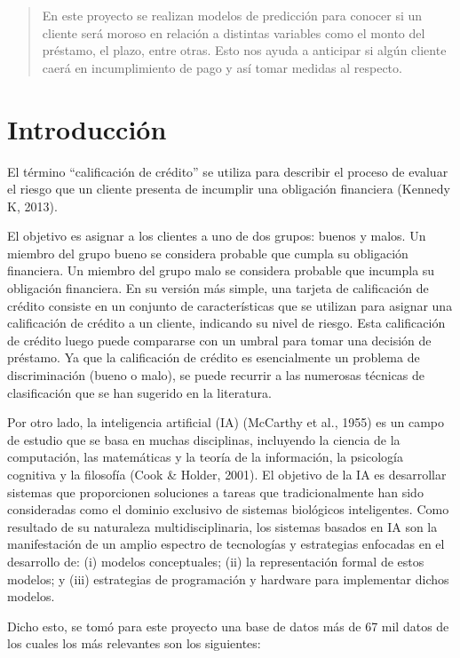 \documentclass[a4paper,12pt]{article}
\begin{document}
    

\begin{abstract}
    En este proyecto se realizan modelos de predicción para conocer si un cliente será moroso en relación a distintas variables como el monto del préstamo, el plazo, entre otras. Esto nos ayuda a anticipar si algún cliente caerá en incumplimiento de pago y así tomar medidas al respecto.
\end{abstract}

\section{Introducción}

El término ``calificación de crédito'' se utiliza para describir el proceso de evaluar el riesgo que un cliente presenta de incumplir una obligación financiera (Kennedy K, 2013).

El objetivo es asignar a los clientes a uno de dos grupos: buenos y malos. Un miembro del grupo bueno se considera probable que cumpla su obligación financiera. Un miembro del grupo malo se considera probable que incumpla su obligación financiera. En su versión más simple, una tarjeta de calificación de crédito consiste en un conjunto de características que se utilizan para asignar una calificación de crédito a un cliente, indicando su nivel de riesgo. Esta calificación de crédito luego puede compararse con un umbral para tomar una decisión de préstamo. Ya que la calificación de crédito es esencialmente un problema de discriminación (bueno o malo), se puede recurrir a las numerosas técnicas de clasificación que se han sugerido en la literatura.

Por otro lado, la inteligencia artificial (IA) (McCarthy et al., 1955) es un campo de estudio que se basa en muchas disciplinas, incluyendo la ciencia de la computación, las matemáticas y la teoría de la información, la psicología cognitiva y la filosofía (Cook \& Holder, 2001). El objetivo de la IA es desarrollar sistemas que proporcionen soluciones a tareas que tradicionalmente han sido consideradas como el dominio exclusivo de sistemas biológicos inteligentes. Como resultado de su naturaleza multidisciplinaria, los sistemas basados en IA son la manifestación de un amplio espectro de tecnologías y estrategias enfocadas en el desarrollo de: (i) modelos conceptuales; (ii) la representación formal de estos modelos; y (iii) estrategias de programación y hardware para implementar dichos modelos.

Dicho esto, se tomó para este proyecto una base de datos más de 67 mil datos de los cuales los más relevantes son los siguientes:
\end{document}
